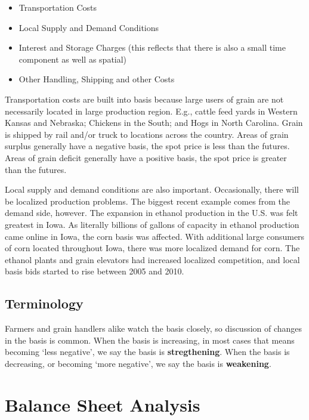 \documentclass[
  letterpaper,
  DIV=11,
  numbers=noendperiod]{scrreprt}
\providecommand{\tightlist}{%
  \setlength{\itemsep}{0pt}\setlength{\parskip}{0pt}}\usepackage{longtable,booktabs,array}
\begin{document}
\begin{itemize}
\tightlist
\item
  Transportation Costs
\item
  Local Supply and Demand Conditions
\item
  Interest and Storage Charges (this reflects that there is also a small
  time component as well as spatial)
\item
  Other Handling, Shipping and other Costs
\end{itemize}

Transportation costs are built into basis because large users of grain
are not necessarily located in large production region. E.g., cattle
feed yards in Western Kansas and Nebraska; Chickens in the South; and
Hogs in North Carolina. Grain is shipped by rail and/or truck to
locations across the country. Areas of grain surplus generally have a
negative basis, the spot price is less than the futures. Areas of grain
deficit generally have a positive basis, the spot price is greater than
the futures.

Local supply and demand conditions are also important. Occasionally,
there will be localized production problems. The biggest recent example
comes from the demand side, however. The expansion in ethanol production
in the U.S. was felt greatest in Iowa. As literally billions of gallons
of capacity in ethanol production came online in Iowa, the corn basis
was affected. With additional large consumers of corn located throughout
Iowa, there was more localized demand for corn. The ethanol plants and
grain elevators had increased localized competition, and local basis
bids started to rise between 2005 and 2010.

\hypertarget{terminology}{%
\section{Terminology}\label{terminology}}

Farmers and grain handlers alike watch the basis closely, so discussion
of changes in the basis is common. When the basis is increasing, in most
cases that means becoming `less negative', we say the basis is
\textbf{stregthening}. When the basis is decreasing, or becoming `more
negative', we say the basis is \textbf{weakening}.


\hypertarget{balance-sheet-analysis}{%
\chapter{Balance Sheet Analysis}\label{balance-sheet-analysis}}
\end{document}
